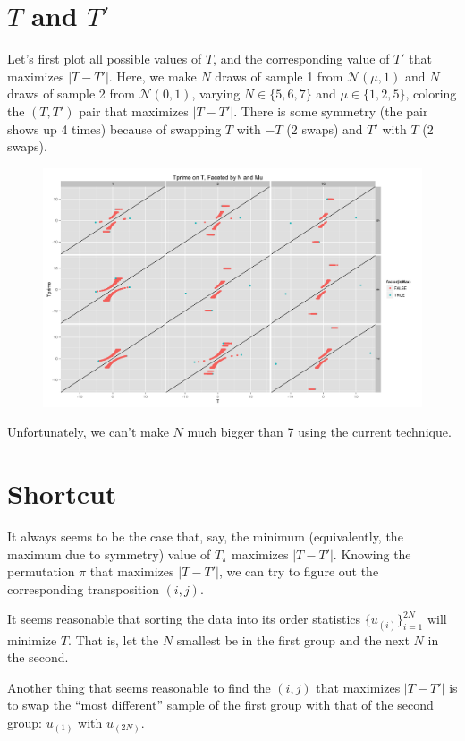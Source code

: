 \section{$T$ and $T'$}
Let's first plot all possible values of $T$, and the corresponding
value of $T'$ that maximizes $|T-T'|$.  Here, we make $N$ draws of
sample 1 from $\mathcal{N}(\mu, 1)$ and $N$ draws of sample 2 from
$\mathcal{N}(0, 1)$, varying $N \in \{5, 6, 7\}$ and $\mu \in \{1, 2,
5\}$, coloring the $(T, T')$ pair that maximizes $|T-T'|$.  There is
some symmetry (the pair shows up 4 times) because of swapping $T$ with
$-T$ (2 swaps) and $T'$ with $T$ (2 swaps).

\begin{figure}[!ht]
  \centering
  \includegraphics[scale=.12]{./simulations/better_bound_condition/t_tprime_plot.png}
\end{figure}

Unfortunately, we can't make $N$ much bigger than 7 using the current
technique.
\clearpage

\section{Shortcut}
It always seems to be the case that, say, the minimum (equivalently,
the maximum due to symmetry) value of $T_{\pi}$ maximizes $|T - T'|$.
Knowing the permutation $\pi$ that maximizes $|T - T'|$, we can try to
figure out the corresponding transposition $(i, j)$.

It seems reasonable that sorting the data into its order statistics
$\{u_{(i)}\}_{i=1}^{2N}$ will minimize $T$.  That is, let the $N$
smallest be in the first group and the next $N$ in the second.

Another thing that seems reasonable to find the $(i, j)$ that maximizes
$|T - T'|$ is to swap the ``most different'' sample of the first group
with that of the second group: $u_{(1)}$ with $u_{(2N)}$.

